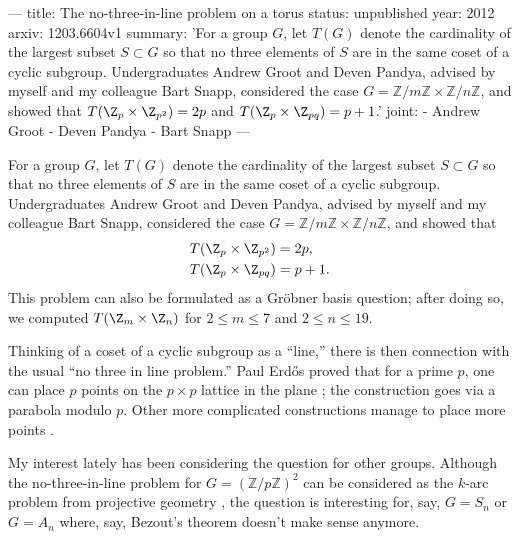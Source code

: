 ---
title: The no-three-in-line problem on a torus
status: unpublished
year: 2012
arxiv: 1203.6604v1
summary: 'For a group $G$, let $T(G)$ denote the cardinality of the largest subset $S \subset G$ so that no three elements of $S$ are in the same coset of a cyclic subgroup.  Undergraduates Andrew Groot and Deven Pandya, advised by myself and my colleague Bart Snapp, considered the case $G = \mathbb{Z}/m\mathbb{Z} \times \mathbb{Z}/n\mathbb{Z}$, and showed that $T(\Z_p \times \Z_{p^2}) = 2p$ and $T(\Z_p \times \Z_{pq}) = p+1$.'
joint:
  - Andrew Groot
  - Deven Pandya
  - Bart Snapp
---

For a group $G$, let $T(G)$ denote the cardinality of the largest subset $S \subset G$ so that no three elements of $S$ are in the same coset of a cyclic subgroup.  Undergraduates Andrew Groot and Deven Pandya, advised by myself and my colleague Bart Snapp, considered the case $G = \mathbb{Z}/m\mathbb{Z} \times \mathbb{Z}/n\mathbb{Z}$, and showed that 
  \begin{align*}
    T(\Z_p \times \Z_{p^2}) &= 2p, \\
    T(\Z_p \times \Z_{pq})  &= p+1.
  \end{align*}
  This problem can also be formulated as a Gr\"obner basis question; after doing so, we computed $T(\Z_m \times \Z_n)$ for $2 \leq m \leq 7$ and $2 \leq n \leq 19$.

Thinking of a coset of a cyclic subgroup as a ``line,'' there is then connection with the usual ``no three in line problem.''  Paul Erd\H{o}s proved that for a prime $p$, one can place $p$ points on the $p\times p$ lattice in the plane \cite{MR41889}; the construction goes via a parabola modulo $p$.  Other more complicated constructions manage to place more points \cite{MR366817}.

My interest lately has been considering the question for other groups.  Although the no-three-in-line problem for $G = (\mathbb{Z}/p\mathbb{Z})^2$ can be considered as the $k$-arc problem from projective geometry \cite{MR554919}, the question is interesting for, say, $G = S_n$ or $G = A_n$ where, say, Bezout's theorem doesn't make sense anymore.
